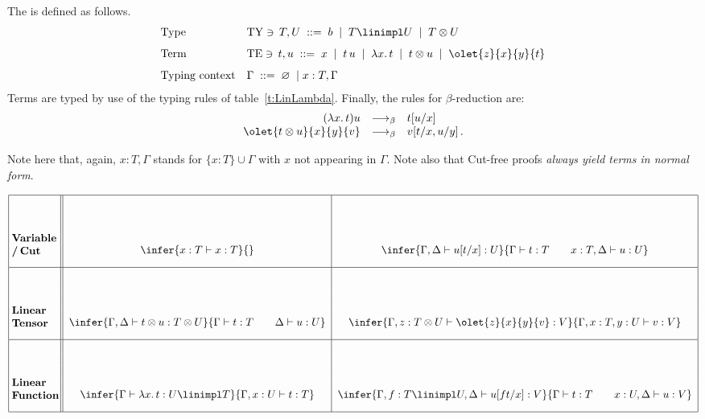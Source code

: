\documentclass{svmult}
\begin{document}
\begin{mydefinition}
The  is defined as follows.
\begin{align*}
&\text{Type} && \mathrm{TY}\ni\, T,U \; ::= \; b \; \mid \; T \linimpl U \; \mid \; T \otimes U
\\[1.5mm]
&\text{Term} && \mathrm{TE}\ni\,t,u\; ::= \; x \; \mid \; {t\,u} \;\mid\; {\lambda x.\, t} \;\mid\; t\otimes u \;\mid\; \olet{z}{x}{y}{t} \\[1.5mm]
&\text{Typing context} && \Gamma \;::=\; \varnothing\; \mid x : T,\Gamma
\end{align*}
Terms are typed by use of the typing rules of table~\ref{t:LinLambda}. Finally,
the rules for $\beta$-reduction are:
\[ \begin{array}{rcl}
(\lambda x. \, t)u & \longrightarrow_\beta & t[u/x] \\
\olet{t \otimes u}{x}{y}{v} & \longrightarrow_\beta & v[t/x,u/y]\,.
\end{array} \]
\deq[-1]
\end{mydefinition}
%
Note here that, again,  $x : T,\Gamma$ stands for $\{x:T\}\cup\Gamma$ with $x$ not appearing in $\Gamma$. Note also that Cut-free proofs \emph{always yield terms in normal form}.
\begin{center}
\renewcommand{\arraystretch}{.3}
{$\begin{array}{|@{\;}l@{\;}||@{\;\;}c@{\;\;}|@{\;\;}c@{\;\;}|} \hline&&\\&&\\&&\\
\parbox{15mm}{\bfseries Variable\\/\,Cut\\} & \infer{x:T \vdash  x:T}{} & \infer{\Gamma,\Delta\vdash u[t/x] : U}{\Gamma \vdash t : T  \qquad x : T, \Delta  \vdash u : U}
\\\hline&&\\&&\\&&\\
\parbox{15mm}{\bfseries Linear\\ Tensor\\} &\infer{\Gamma,\Delta\vdash t\otimes u:T\otimes U}{\Gamma\vdash t:T\qquad\Delta\vdash u:U} &%
\infer{\Gamma,z:T\otimes U\vdash\olet{z}{x}{y}{v}:V}{\Gamma,x:T,y:U\vdash v:V}
\\\hline&&\\&&\\&&\\
\parbox{15mm}{\bfseries Linear\\ Function\\} &\infer{\Gamma\vdash\lambda x.\,t:U\linimpl T}{\Gamma,x:U\vdash t:T} &%
\infer{\Gamma,f:T\linimpl U,\Delta\vdash u[ft/x]:V}{\Gamma\vdash t:T\qquad x:U,\Delta\vdash u:V}
\\\hline
\end{array}$}\label{t:LinLambda}
\end{center}
\end{document}
